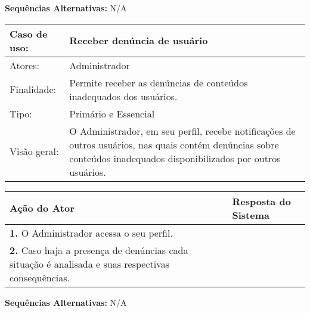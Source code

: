 \documentclass[12pt,a4paper,onecolumn,titlepage]{article}
\begin{document}
\textbf{Sequências Alternativas:} N/A

\newpage

\begin{table}[h!]
\begin{center}
\begin{tabular}{p{2.5cm} p{9.5cm}}
Caso de uso: & \textbf{Receber denúncia de usuário} \\ \hline
Atores: & Administrador \\ \hline
Finalidade: & Permite receber as denúncias de conteúdos inadequados dos usuários. \\ \hline
Tipo: & Primário e Essencial \\ \hline
Visão geral: & O Administrador, em seu perfil, recebe notificações de outros usuários, nas quais contém denúncias sobre conteúdos inadequados disponibilizados por outros usuários.

\end{tabular}
\end{center}
\end{table}

\begin{center}
\def\arraystretch{1.1}
\begin{tabular}{|p{6cm}|p{6cm}|}

\hline
\textbf{Ação do Ator} & \textbf{Resposta do Sistema} \\ \hline
\textbf{1.} O Administrador acessa o seu perfil.  & \\ \hline
\textbf{2.} Caso haja a presença de denúncias cada situação é analisada e suas respectivas consequências.  & \\ \hline 
\end{tabular}
\end{center}

\textbf{Sequências Alternativas:} N/A
\end{document}
